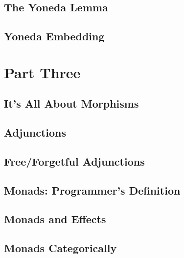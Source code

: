 \chapter{The Yoneda Lemma}\label{the-yoneda-lemma}


\chapter{Yoneda Embedding}\label{yoneda-embedding}


\part*{Part Three}

\chapter{It's All About Morphisms} %


\chapter{Adjunctions}\label{adjunctions}


\chapter{Free/Forgetful Adjunctions}\label{free-forgetful-adjunctions}


\chapter{Monads: Programmer's Definition}\label{monads-programmers-definition}


\chapter{Monads and Effects}\label{monads-and-effects}


\chapter{Monads Categorically}\label{monads-categorically}


